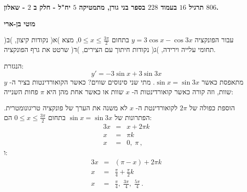 \documentclass[12pt,a4paper]{article}
\begin{document}
\thispagestyle{empty}

\begin{center}
\textbf{%
תרגיל
$16$
בעמוד 
$228$
בספר בני גורן, מתמטיקה
$5$
יח"ל - חלק ב%
$2$
- שאלון
$806$.}

\textbf{מוטי בן-ארי}
\end{center}
עבור הפונקציה
$y=3\cos x -  \cos 3x$
בתחום
$0\leq x \leq \displaystyle \frac{3\pi}{2}$,
מצא )א( נקודות קיצון, )ב( תחומי עלייה וירידה, )ג( נקודות חיתוך עם הצירים, )ד( שרטט את גרף הפונקציה.

הנגזרת: 
\[
y'=-3\sin x + 3 \sin 3x
\]
מתאפסת כאשר 
$\sin x = \sin 3x$.
מתי שני סינוסים שווים? כאשר הקואורדינטות בציר ה-%
$y$
שוות, וזה קורה כאשר קואורדינטות ה-%
$x$
שוות או כאשר אחת מהן היא
$\pi$
פחות השנייה:
\begin{center}
\end{center}
הוספת כפולה של
$2\pi$
לקואורדינטת ה-%
$x$
לא משנה את הערך של פונקציה טריגונומטרית. הפתרונות של
$\sin x = \sin 3x$
בתחום 
$0\leq x \leq \displaystyle \frac{3\pi}{2}$
הם:
\begin{eqnarray*}
3x &=& x + 2\pi k\\
x &=& \pi k\\
x&=& 0, \; \pi\,,
\end{eqnarray*}
\vspace{-2ex}
ו:
\vspace{-2ex}
\begin{eqnarray*}
3x &=& (\pi - x) + 2\pi k\\
x &=& \frac{\pi}{4} + \frac{\pi}{2} k\\
x&=& \frac{\pi}{4},\; \frac{3\pi}{4}, \; \frac{5\pi}{4}\,.
\end{eqnarray*}

\vspace{-2ex}
\end{document}
